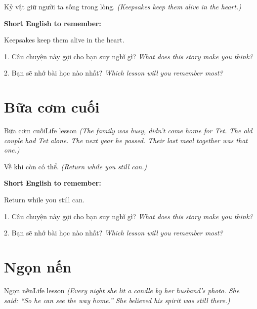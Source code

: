 \begin{baihoc}
Kỷ vật giữ người ta sống trong lòng.
\textit{(Keepsakes keep them alive in the heart.)}
\end{baihoc}

\begin{ghinhoanh}
\textbf{Short English to remember:}

Keepsakes keep them alive in the heart.

\end{ghinhoanh}

\begin{tuhocnhanh}
1. Câu chuyện này gợi cho bạn suy nghĩ gì? \textit{What does this story make you think?}

2. Bạn sẽ nhớ bài học nào nhất? \textit{Which lesson will you remember most?}
\end{tuhocnhanh}
\ngancach


\section{Bữa cơm cuối}
\begin{truyen}{Bữa cơm cuối}{Life lesson}
\textit{(The family was busy, didn't come home for Tet. The old couple had Tet alone. The next year he passed. Their last meal together was that one.)}
\end{truyen}

\begin{baihoc}
Về khi còn có thể.
\textit{(Return while you still can.)}
\end{baihoc}

\begin{ghinhoanh}
\textbf{Short English to remember:}

Return while you still can.

\end{ghinhoanh}

\begin{tuhocnhanh}
1. Câu chuyện này gợi cho bạn suy nghĩ gì? \textit{What does this story make you think?}

2. Bạn sẽ nhớ bài học nào nhất? \textit{Which lesson will you remember most?}
\end{tuhocnhanh}
\ngancach


\section{Ngọn nến}
\begin{truyen}{Ngọn nến}{Life lesson}
\textit{(Every night she lit a candle by her husband's photo. She said: ``So he can see the way home.'' She believed his spirit was still there.)}
\end{truyen}

